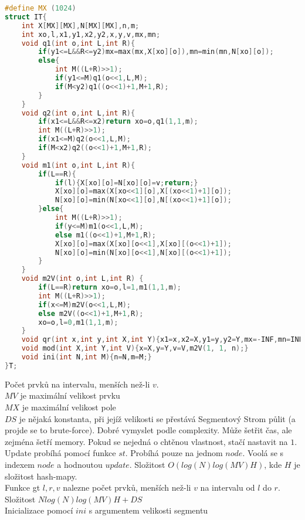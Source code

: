 \documentclass[11pt]{article}
\begin{document}
\begin{lstlisting}[language=C++]
#define MX (1024)
struct IT{
    int X[MX][MX],N[MX][MX],n,m;
    int xo,l,x1,y1,x2,y2,x,y,v,mx,mn;
    void q1(int o,int L,int R){
        if(y1<=L&&R<=y2)mx=max(mx,X[xo][o]),mn=min(mn,N[xo][o]);
        else{
            int M((L+R)>>1);
            if(y1<=M)q1(o<<1,L,M);
            if(M<y2)q1((o<<1)+1,M+1,R);
        }
    }
    void q2(int o,int L,int R){
        if(x1<=L&&R<=x2)return xo=o,q1(1,1,m);
        int M((L+R)>>1);
        if(x1<=M)q2(o<<1,L,M);
        if(M<x2)q2((o<<1)+1,M+1,R);
    }
    void m1(int o,int L,int R){
        if(L==R){
            if(l){X[xo][o]=N[xo][o]=v;return;}
            X[xo][o]=max(X[xo<<1][o],X[(xo<<1)+1][o]);
            N[xo][o]=min(N[xo<<1][o],N[(xo<<1)+1][o]);
        }else{
            int M((L+R)>>1);
            if(y<=M)m1(o<<1,L,M);
            else m1((o<<1)+1,M+1,R);
            X[xo][o]=max(X[xo][o<<1],X[xo][(o<<1)+1]);
            N[xo][o]=min(N[xo][o<<1],N[xo][(o<<1)+1]);
        }
    }
    void m2V(int o,int L,int R) {
        if(L==R)return xo=o,l=1,m1(1,1,m);
        int M((L+R)>>1);
        if(x<=M)m2V(o<<1,L,M);
        else m2V((o<<1)+1,M+1,R);
        xo=o,l=0,m1(1,1,m);
    }
    void qr(int x,int y,int X,int Y){x1=x,x2=X,y1=y,y2=Y,mx=-INF,mn=INF,q2(1,1,n);}
    void mod(int X,int Y,int V){x=X,y=Y,v=V,m2V(1, 1, n);}
    void ini(int N,int M){n=N,m=M;}
}T;
\end{lstlisting}
Počet prvků na intervalu, menších než-li $v$.
\\$MV$ je maximální velikost prvku
\\$MX$ je maximální velikost pole
\\$DS$ je nějaká konstanta, při jejíž velikosti se přestává Segmentový Strom půlit (a projde se to brute-force). Dobré vymyslet podle complexity. Může šetřit čas, ale zejména šetří memory. Pokud se nejedná o chtěnou vlastnost, stačí nastavit na $1$.
\\Update probíhá pomocí funkce $st$. Probíhá pouze na jednom $node$. Voolá se s indexem $node$ a hodnoutou $update$. Složitost $O(log(N)log(MV)H)$, kde $H$ je složitost hash-mapy.
\\Funkce gt $l,r,v$ nalezne počet prvků, menších než-li $v$ na intervalu od $l$ do $r$. Složitost $Nlog(N)log(MV)H+DS$
\\Inicializace pomocí $ini$ s argumentem velikosti segmentu
\end{document}
